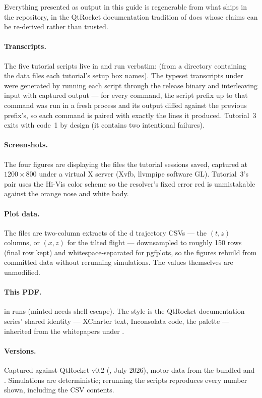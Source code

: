Everything presented as output in this guide is regenerable from what ships in
the repository, in the QtRocket documentation tradition of docs whose claims
can be re-derived rather than trusted.

\paragraph{Transcripts.} The five tutorial scripts live in
 and run verbatim:
 (from a directory containing the data files
each tutorial's setup box names). The typeset transcripts under
 were generated by running each
script through the release binary and interleaving input with captured output
--- for every command, the script prefix up to that command was run in a fresh
process and its output diffed against the previous prefix's, so each command
is paired with exactly the lines it produced. Tutorial~3 exits with code~1 by
design (it contains two intentional failures).

\paragraph{Screenshots.} The four figures are 
displaying the  files the tutorial sessions saved, captured at
$1200\times800$ under a virtual X server (Xvfb, llvmpipe software GL).
Tutorial~3's pair uses the Hi-Vis color scheme so the resolver's fixed error
red is unmistakable against the orange nose and white body.

\paragraph{Plot data.} The  files are two-column extracts of
the d trajectory CSVs --- the $(t,z)$ columns, or $(x,z)$ for the
tilted flight --- downsampled to roughly 150 rows (final row kept) and
whitespace-separated for pgfplots, so the figures rebuild from committed data
without rerunning simulations. The values themselves are unmodified.

\paragraph{This PDF.}  in  runs
 (minted needs shell escape). The style is
the QtRocket documentation series' shared identity --- XCharter text,
Inconsolata code, the  palette --- inherited from the whitepapers
under .

\paragraph{Versions.} Captured against QtRocket v0.2
(, July 2026), motor data from the bundled
 and .
Simulations are deterministic; rerunning the scripts reproduces every number
shown, including the CSV contents.
